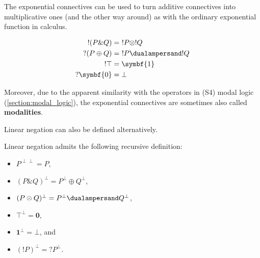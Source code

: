     The exponential connectives can be used to turn additive connectives into multiplicative ones (and the other way around) as with the ordinary exponential function in calculus.
    \begin{property}
        \begin{gather}
            \begin{aligned}
                !(P\& Q) &=\ !P\otimes!Q\\
                ?(P\oplus Q) &=\ !P\dualampersand!Q\\
                !\top &= \symbf{1}\\
                ?\symbf{0} &= \bot
            \end{aligned}
        \end{gather}
    \end{property}
    Moreover, due to the apparent similarity with the operators in (S4) modal logic (\cref{section:modal_logic}), the exponential connectives are sometimes also called \textbf{modalities}.

    Linear negation can also be defined alternatively.
    \begin{property}[Negation]\label{quantum_information:negation}
        Linear negation admits the following recursive definition:
        \begin{itemize}
            \item $P^{\perp\perp}=P$,
            \item $(P\& Q)^\perp=P^\perp\oplus Q^\perp$,
            \item $(P\otimes Q)^\perp=P^\perp\dualampersand Q^\perp$,
            \item $\top^\perp=\symbf{0}$,
            \item $\symbf{1}^\perp=\bot$, and
            \item $(!P)^\perp=?P^\perp$.
        \end{itemize}
    \end{property}

